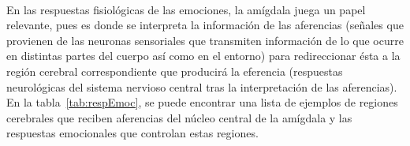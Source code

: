 \paragraph{}
En las respuestas fisiológicas de las emociones, la amígdala juega un papel relevante, pues es donde se interpreta la información de las 	aferencias (señales que provienen de las neuronas sensoriales que transmiten información de lo que ocurre en distintas partes del cuerpo así como en el entorno) para redireccionar ésta a la región cerebral correspondiente que producirá la eferencia (respuestas neurológicas del sistema nervioso central tras la interpretación de las aferencias). En la tabla~\ref{tab:respEmoc}, se puede encontrar una lista de ejemplos de regiones cerebrales que reciben aferencias del núcleo central de la amígdala y las respuestas emocionales que controlan estas regiones.

